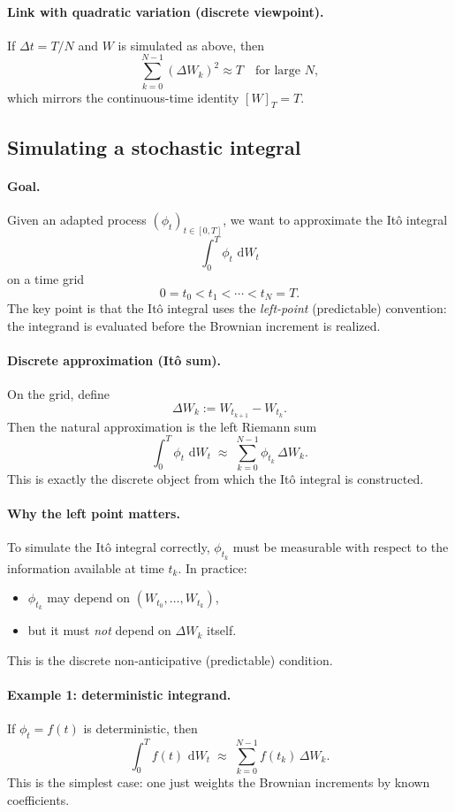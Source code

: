 \documentclass[11pt]{article}
\newcommand{\dd}{\,\mathrm{d}}
\newcommand{\1}{\mathbf{1}}
\theoremstyle{plain}
\theoremstyle{definition}
\theoremstyle{remark}
\begin{document}
\paragraph{Link with quadratic variation (discrete viewpoint).}
If $\Delta t=T/N$ and $W$ is simulated as above, then
\[
\sum_{k=0}^{N-1} (\Delta W_k)^2 \approx T
\quad\text{for large }N,
\]
which mirrors the continuous-time identity $[W]_T=T$.

\subsection{Simulating a stochastic integral}

\paragraph{Goal.}
Given an adapted process $(\phi_t)_{t\in[0,T]}$, we want to approximate the It\^o integral
\[
\int_0^T \phi_t\,\dd W_t
\]
on a time grid
\[
0=t_0<t_1<\cdots<t_N=T.
\]
The key point is that the It\^o integral uses the \emph{left-point} (predictable) convention:
the integrand is evaluated before the Brownian increment is realized.

\paragraph{Discrete approximation (It\^o sum).}
On the grid, define
\[
\Delta W_k := W_{t_{k+1}}-W_{t_k}.
\]
Then the natural approximation is the left Riemann sum
\[
\int_0^T \phi_t\,\dd W_t
\;\approx\;
\sum_{k=0}^{N-1} \phi_{t_k}\,\Delta W_k.
\]
This is exactly the discrete object from which the It\^o integral is constructed.

\paragraph{Why the left point matters.}
To simulate the It\^o integral correctly, $\phi_{t_k}$ must be measurable with respect to the information available at time $t_k$.
In practice:
\begin{itemize}[leftmargin=1.6em, itemsep=0.25em]
\item $\phi_{t_k}$ may depend on $(W_{t_0},\dots,W_{t_k})$,
\item but it must \emph{not} depend on $\Delta W_k$ itself.
\end{itemize}
This is the discrete non-anticipative (predictable) condition.

\paragraph{Example 1: deterministic integrand.}
If $\phi_t=f(t)$ is deterministic, then
\[
\int_0^T f(t)\,\dd W_t
\;\approx\;
\sum_{k=0}^{N-1} f(t_k)\,\Delta W_k.
\]
This is the simplest case: one just weights the Brownian increments by known coefficients.
\end{document}
